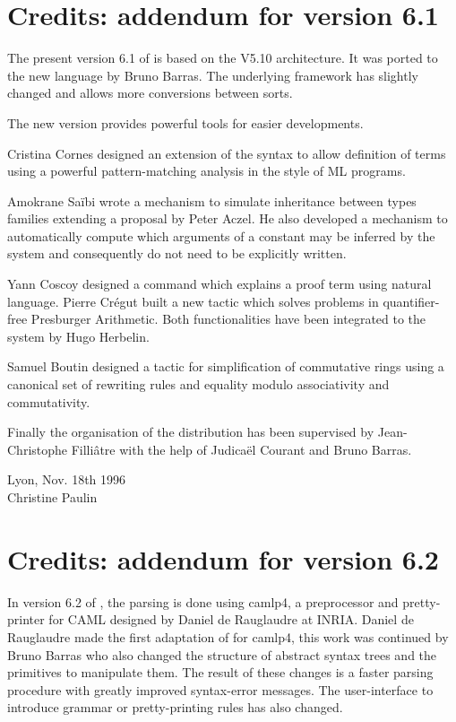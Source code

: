 \section*{Credits: addendum for version 6.1}

The present version 6.1 of \Coq{} is based on the V5.10 architecture. It
was ported to the new language {\ocaml} by Bruno Barras. The
underlying framework has slightly changed and allows more conversions
between sorts. 

The new version provides powerful tools for easier developments. 

Cristina Cornes designed an extension of the \Coq{} syntax to allow
definition of terms using a powerful pattern-matching analysis in the
style of ML programs.

Amokrane Saïbi wrote a mechanism to simulate
inheritance between types families extending a proposal by Peter
Aczel. He also developed a mechanism to automatically compute which
arguments of a constant may be inferred by the system and consequently
do not need to be explicitly written. 

Yann Coscoy designed a command which explains a proof term using
natural language. Pierre Cr{\'e}gut built a new tactic which solves
problems in quantifier-free Presburger Arithmetic. Both
functionalities have been integrated to the \Coq{} system by Hugo
Herbelin.

Samuel Boutin designed a tactic for simplification of commutative
rings using a canonical set of rewriting rules and equality modulo
associativity and commutativity. 

Finally the organisation of the \Coq{} distribution has been supervised
by Jean-Christophe Filliâtre with the help of Judicaël Courant
and Bruno Barras.

\begin{flushright}
Lyon, Nov. 18th 1996\\
Christine Paulin
\end{flushright}

\section*{Credits: addendum for version 6.2}

In version 6.2 of \Coq{}, the parsing is done using camlp4, a
preprocessor and pretty-printer for CAML designed by Daniel de
Rauglaudre at INRIA.  Daniel de Rauglaudre made the first adaptation
of \Coq{} for camlp4, this work was continued by Bruno Barras who also
changed the structure of \Coq{} abstract syntax trees and the primitives
to manipulate them. The result of
these changes is a faster parsing procedure with greatly improved
syntax-error messages. The user-interface to introduce grammar or
pretty-printing rules has also changed.

